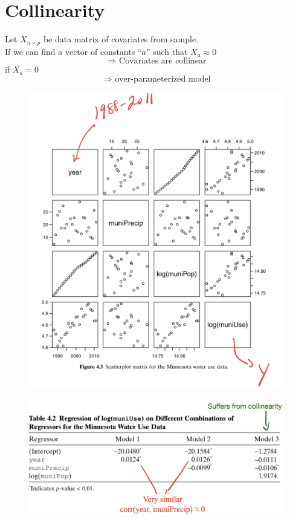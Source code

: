 \documentclass[14pt]{extarticle}
\begin{document}
\section*{Collinearity}

\noindent
Let $X_{n \times p}$ be data matrix of covariates from sample. \\
If we can find a vector of constants ``$a$'' such that $X_a \approx 0$
\[
\Rightarrow \text{ Covariates are collinear}
\]
if $X_a = 0$
\[
\Rightarrow \text{ over-parameterized model}
\]
\begin{figure}[H]
    \centering
    \includegraphics[width=1\textwidth]{fig4.png}
\end{figure}
\begin{figure}[H]
    \centering
    \includegraphics[width=1\textwidth]{fig5.png}
\end{figure}
\end{document}
